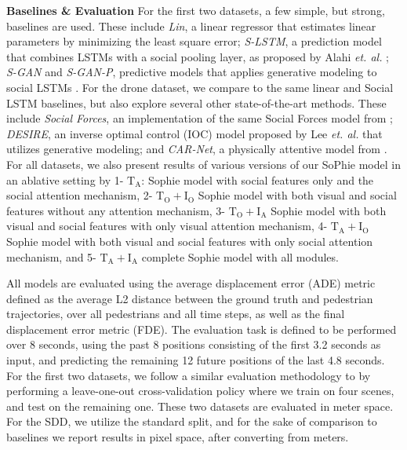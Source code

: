 \documentclass[10pt,twocolumn,letterpaper]{article}
\begin{document}
\textbf{Baselines \& Evaluation} For the first two datasets, a few simple, but strong, baselines are used. These include \textit{Lin}, a linear regressor that estimates linear parameters by minimizing the least square error; \textit{S-LSTM}, a prediction model that combines LSTMs with a social pooling layer, as proposed by Alahi \textit{et. al.} \cite{alahi2016social}; \textit{S-GAN} and \textit{S-GAN-P}, predictive models that applies generative modeling to social LSTMs \cite{gupta2018social}. For the drone dataset, we compare to the same linear and Social LSTM baselines, but also explore several other state-of-the-art methods. These include \textit{Social Forces}, an implementation of the same Social Forces model from \cite{yamaguchi2011you}; \textit{DESIRE}, an inverse optimal control (IOC) model proposed by Lee \textit{et. al.} that utilizes generative modeling; and \textit{CAR-Net}, a physically attentive model from \cite{sadeghian2017car}. 
For all datasets, we also present results of various versions of our SoPhie model in an ablative setting by 
1- $\mathrm{T_A}$: Sophie model with social features only and the social attention mechanism, 2- $\mathrm{T_O+I_O}$ Sophie model with both visual and social features without any attention mechanism, 3- $\mathrm{T_O+I_A}$ Sophie model with both visual and social features with only visual attention mechanism, 4- $\mathrm{T_A+I_O}$ Sophie model with both visual and social features with only social attention mechanism, and 5- $\mathrm{T_A+I_A}$ complete Sophie model with all modules. 



All models are evaluated using the average displacement error (ADE) metric defined as the average L2 distance between the ground truth and pedestrian trajectories, over all pedestrians and all time steps, as well as the final displacement error metric (FDE). The evaluation task is defined to be performed over 8 seconds, using the past 8 positions consisting of the first 3.2 seconds as input, and predicting the remaining 12 future positions of the last 4.8 seconds. For the first two datasets, we follow a similar evaluation methodology to \cite{gupta2018social} by performing a leave-one-out cross-validation policy where we train on four scenes, and test on the remaining one. These two datasets are evaluated in meter space. For the SDD, we utilize the standard split, and for the sake of comparison to baselines we report results in pixel space, after converting from meters.
\end{document}
